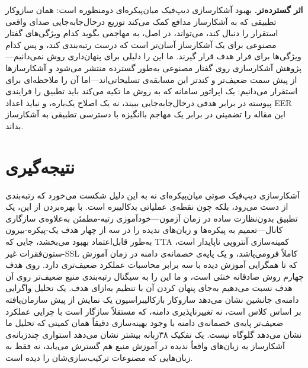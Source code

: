 \documentclass[a4paper,11pt]{article}
\begin{document}
\textbf{اثر گسترده‌تر.} بهبود آشکارسازی دیپ‌فیک میان‌پیکره‌ای دومنظوره
است: همان سازوکار تطبیقی که به آشکارساز مدافع کمک می‌کند توزیع
درحال‌جابه‌جایی صدای واقعی استقرار را دنبال کند، می‌تواند، در اصل، به
مهاجمی بگوید کدام ویژگی‌های گفتار مصنوعی برای یک آشکارساز آسان‌تر است که
درست رتبه‌بندی کند، و پس کدام ویژگی‌ها برای فرار هدف قرار گیرند. ما این را
دلیلی برای پنهان‌داری روش نمی‌دانیم---پژوهش آشکارسازی روی گفتار مصنوعی
به‌طور گسترده منتشر می‌شود و آشکارسازها از پیش سمت ضعیف‌تر و کندتر این
مسابقه‌ی تسلیحاتی‌اند---اما آن را ملاحظه‌ای برای استقرار می‌دانیم: یک
اپراتور سامانه که به روش ما تکیه می‌کند باید تطبیق را فرایندی پیوسته در
برابر هدفی درحال‌جابه‌جایی ببیند، نه یک اصلاح یک‌باره، و نباید اعداد EER
این مقاله را تضمینی در برابر یک مهاجم باانگیزه با دسترسی تطبیقی به
آشکارساز بداند.

\section{نتیجه‌گیری}
آشکارسازی دیپ‌فیک صوتی میان‌پیکره‌ای نه به این دلیل شکست می‌خورد که
رتبه‌بندی از دست می‌رود، بلکه چون نقطه‌ی عملیاتی بدکالیبره است. با بهره‌بردن
از این، یک تطبیق بدون‌نظارت ساده در زمان آزمون---خودآموزی رتبه-مطمئن به‌علاوه‌ی
سازگاری کانال---تعمیم به پیکره‌ها و زبان‌های ندیده را در سه از چهار هدف
یک-پیکره-بیرون به‌طور قابل‌اعتماد بهبود می‌بخشد، جایی که TTA کمینه‌سازی
آنتروپی ناپایدار است، ستون‌فقرات غیر-SSL کاملاً فرومی‌پاشد، و یک پایه‌ی
خصمانه‌ی دامنه در زمان آموزش که تا همگرایی آموزش دیده با سه برابر محاسبات
عملکرد ضعیف‌تری دارد. روی هدف چهارم روش صادقانه خنثی است، و ما این را به
سیگنال رتبه‌بندی منبع ضعیف‌تر روی آن هدف نسبت می‌دهیم به‌جای پنهان کردن آن
با تنظیم به‌ازای هدف. یک تحلیل واگرایی دامنه‌ی جانشین نشان می‌دهد سازوکار
بازکالیبراسیون یک نمایش از پیش سازمان‌یافته بر اساس کلاس است، نه
تغییرناپذیری دامنه، که مستقلاً سازگار است با چرایی عملکرد ضعیف‌تر پایه‌ی
خصمانه‌ی دامنه با وجود بهینه‌سازی دقیقاً همان کمیتی که تحلیل ما نشان می‌دهد
گلوگاه نیست. یک تفکیک ۳۸‌زبانه بیشتر نشان می‌دهد استواری چندزبانه‌ی
آشکارساز به زبان‌های واقعاً ندیده در آموزش منبع هم گسترش می‌یابد، نه فقط
به زبان‌هایی که مصنوعات ترکیب‌سازی‌شان را دیده است.
\end{document}
